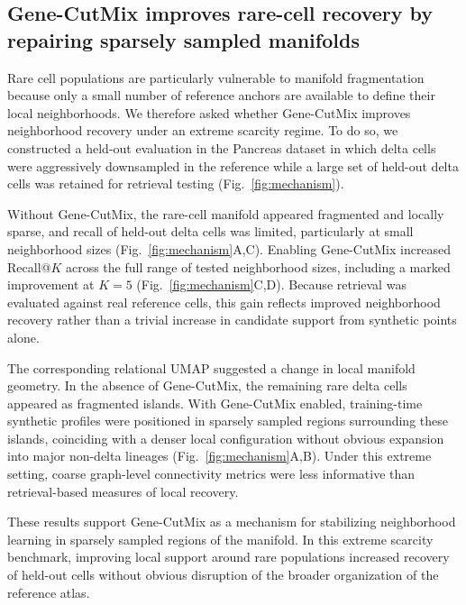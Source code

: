 \documentclass[11pt]{article}
\begin{document}
\subsection{Gene-CutMix improves rare-cell recovery by repairing sparsely sampled manifolds}

Rare cell populations are particularly vulnerable to manifold fragmentation because only a small number of reference anchors are available to define their local neighborhoods. We therefore asked whether Gene-CutMix improves neighborhood recovery under an extreme scarcity regime. To do so, we constructed a held-out evaluation in the Pancreas dataset in which delta cells were aggressively downsampled in the reference while a large set of held-out delta cells was retained for retrieval testing (Fig.~\ref{fig:mechanism}).

Without Gene-CutMix, the rare-cell manifold appeared fragmented and locally sparse, and recall of held-out delta cells was limited, particularly at small neighborhood sizes (Fig.~\ref{fig:mechanism}A,C). Enabling Gene-CutMix increased Recall@$K$ across the full range of tested neighborhood sizes, including a marked improvement at $K=5$ (Fig.~\ref{fig:mechanism}C,D). Because retrieval was evaluated against real reference cells, this gain reflects improved neighborhood recovery rather than a trivial increase in candidate support from synthetic points alone.

The corresponding relational UMAP suggested a change in local manifold geometry. In the absence of Gene-CutMix, the remaining rare delta cells appeared as fragmented islands. With Gene-CutMix enabled, training-time synthetic profiles were positioned in sparsely sampled regions surrounding these islands, coinciding with a denser local configuration without obvious expansion into major non-delta lineages (Fig.~\ref{fig:mechanism}A,B). Under this extreme setting, coarse graph-level connectivity metrics were less informative than retrieval-based measures of local recovery.

These results support Gene-CutMix as a mechanism for stabilizing neighborhood learning in sparsely sampled regions of the manifold. In this extreme scarcity benchmark, improving local support around rare populations increased recovery of held-out cells without obvious disruption of the broader organization of the reference atlas.
\end{document}
